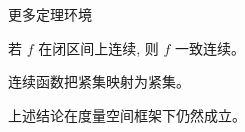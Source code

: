 
\begin{frame}{更多定理环境}
  \begin{lemma}{}
    若 $f$ 在闭区间上连续, 则 $f$ 一致连续。
  \end{lemma}

  \begin{proposition}{}
    连续函数把紧集映射为紧集。
  \end{proposition}

  \begin{remark}{}
    上述结论在度量空间框架下仍然成立。
  \end{remark}
\end{frame}
